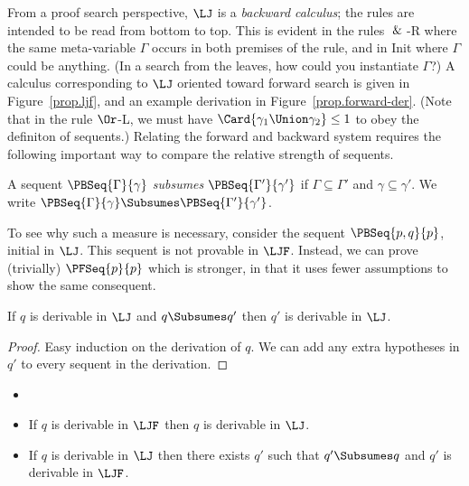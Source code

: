 
From a proof search perspective, $\LJ$ is a \emph{backward calculus};
the rules are intended to be read from bottom to top.
This is evident
in the rules $\And$-R where the same meta-variable
$\Gamma$ occurs in both premises of the rule, and in Init where
$\Gamma$ could be anything.  (In a search from the leaves, how could you
instantiate $\Gamma$?)
A calculus corresponding to $\LJ$ oriented toward forward search is given in
Figure~\ref{prop.ljf}, and an example derivation in
Figure~\ref{prop.forward-der}.  (Note that in the rule $\Or$-L,
we must have $\Card{\gamma_1\Union\gamma_2} \leq 1$ to obey the
definiton of sequents.)
Relating the forward and backward system requires the following
important way to compare the relative strength of sequents.




\begin{definition}[Subsumption]
A sequent $\PBSeq{\Gamma}{\gamma}$ \emph{subsumes}
$\PBSeq{\Gamma'}{\gamma'}$ if $\Gamma\subseteq\Gamma'$ and
$\gamma\subseteq\gamma'$.  We write
$\PBSeq{\Gamma}{\gamma}\Subsumes\PBSeq{\Gamma'}{\gamma'}$.
\end{definition}

\noindent
To see why such a measure is necessary, consider the sequent
$\PBSeq{p, q}{p}$, initial in $\LJ$.  This sequent is not provable
in $\LJF$.  Instead, we can prove (trivially) $\PFSeq{p}{p}$ which
is stronger, in that it uses fewer assumptions to show the same
consequent.

\begin{theorem}
If $q$ is derivable in $\LJ$ and $q\Subsumes q'$ then $q'$ is derivable
in $\LJ$.
\end{theorem}

\begin{proof}
  Easy induction on the derivation of $q$.  We can add any extra hypotheses
in $q'$ to every sequent in the derivation.
\end{proof}

\begin{theorem}
  \begin{itemize}
  \item []
  \item If $q$ is derivable in $\LJF$ then $q$ is derivable in $\LJ$.
  \item If $q$ is derivable in $\LJ$ then there exists $q'$ such
    that $q'\Subsumes q$ and $q'$ is derivable in $\LJF$.
  \end{itemize}
\end{theorem}

